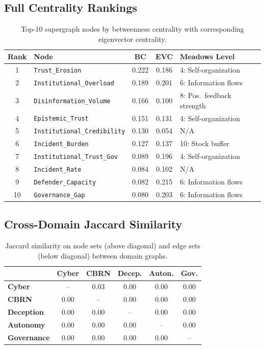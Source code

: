 \documentclass[11pt]{article}
\begin{document}
\subsection{Full Centrality Rankings}

\begin{table}[H]
\centering
\caption{Top-10 supergraph nodes by betweenness centrality with corresponding eigenvector centrality.}
\label{tab:centrality_full}
\small
\begin{tabular}{@{}clccl@{}}
\toprule
\textbf{Rank} & \textbf{Node} & \textbf{BC} & \textbf{EVC} & \textbf{Meadows Level} \\
\midrule
1 & \texttt{Trust\_Erosion} & 0.222 & 0.186 & 4: Self-organization \\
2 & \texttt{Institutional\_Overload} & 0.189 & 0.201 & 6: Information flows \\
3 & \texttt{Disinformation\_Volume} & 0.166 & 0.100 & 8: Pos.\ feedback strength \\
4 & \texttt{Epistemic\_Trust} & 0.151 & 0.131 & 4: Self-organization \\
5 & \texttt{Institutional\_Credibility} & 0.130 & 0.054 & N/A \\
6 & \texttt{Incident\_Burden} & 0.127 & 0.137 & 10: Stock buffer \\
7 & \texttt{Institutional\_Trust\_Gov} & 0.089 & 0.196 & 4: Self-organization \\
8 & \texttt{Incident\_Rate} & 0.084 & 0.102 & N/A \\
9 & \texttt{Defender\_Capacity} & 0.082 & 0.215 & 6: Information flows \\
10 & \texttt{Governance\_Gap} & 0.080 & 0.203 & 6: Information flows \\
\bottomrule
\end{tabular}
\end{table}

\subsection{Cross-Domain Jaccard Similarity}

\begin{table}[H]
\centering
\caption{Jaccard similarity on node sets (above diagonal) and edge sets (below diagonal) between domain graphs.}
\small
\begin{tabular}{@{}lccccc@{}}
\toprule
& \textbf{Cyber} & \textbf{CBRN} & \textbf{Decep.} & \textbf{Auton.} & \textbf{Gov.} \\
\midrule
\textbf{Cyber} & -- & 0.03 & 0.00 & 0.00 & 0.00 \\
\textbf{CBRN} & 0.00 & -- & 0.00 & 0.00 & 0.00 \\
\textbf{Deception} & 0.00 & 0.00 & -- & 0.00 & 0.00 \\
\textbf{Autonomy} & 0.00 & 0.00 & 0.00 & -- & 0.00 \\
\textbf{Governance} & 0.00 & 0.00 & 0.00 & 0.00 & -- \\
\bottomrule
\end{tabular}
\end{table}
\end{document}
